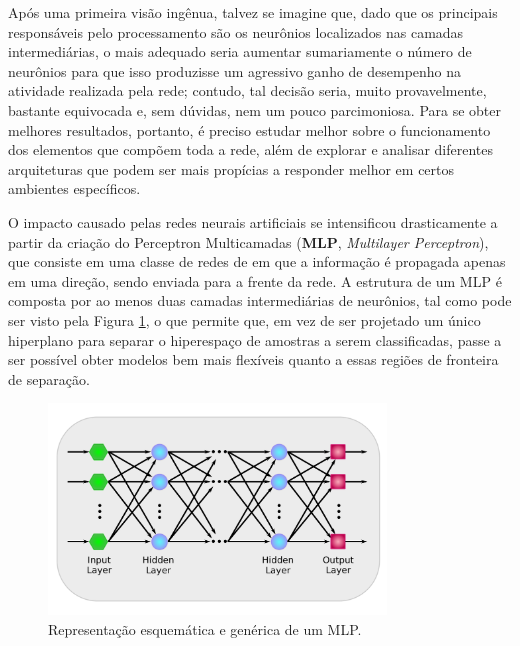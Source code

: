 
Após uma primeira visão ingênua, talvez se imagine que, dado que os principais responsáveis pelo processamento são os neurônios localizados nas camadas intermediárias, o mais adequado seria aumentar sumariamente o número de neurônios para que isso produzisse um agressivo ganho de desempenho na atividade realizada pela rede; contudo, tal decisão seria, muito provavelmente, bastante equivocada e, sem dúvidas, nem um pouco parcimoniosa. Para se obter melhores resultados, portanto, é preciso estudar melhor sobre o funcionamento dos elementos que compõem toda a rede, além de explorar e analisar diferentes arquiteturas que podem ser mais propícias a responder melhor em certos ambientes específicos.

O impacto causado pelas redes neurais artificiais se intensificou drasticamente a partir da criação do Perceptron Multicamadas (\textbf{MLP}, \textit{Multilayer Perceptron}), que consiste em uma classe de redes de em que a informação é propagada apenas em uma direção, sendo enviada para a frente da rede. A estrutura de um MLP é composta por ao menos duas camadas intermediárias de neurônios, tal como pode ser visto pela Figura \ref{fig:ann_mlp}, o que permite que, em vez de ser projetado um único hiperplano para separar o hiperespaço de amostras a serem classificadas, passe a ser possível obter modelos bem mais flexíveis quanto a essas regiões de fronteira de separação.


\begin{figure}[H]
    \centering
    \includegraphics[width=0.8\textwidth]{figs/ann_mlp.pdf}
    \caption{Representação esquemática e genérica de um MLP.}
    \label{fig:ann_mlp}
\end{figure}

